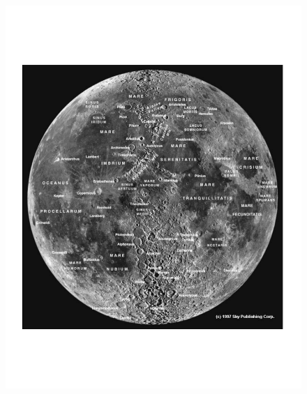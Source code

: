 \documentclass[12pt]{article}%
\begin{document}
\begin{figure}[htb!]
\center
\includegraphics[width=15cm]{moon_map.pdf}
\end{figure}
\end{document}
